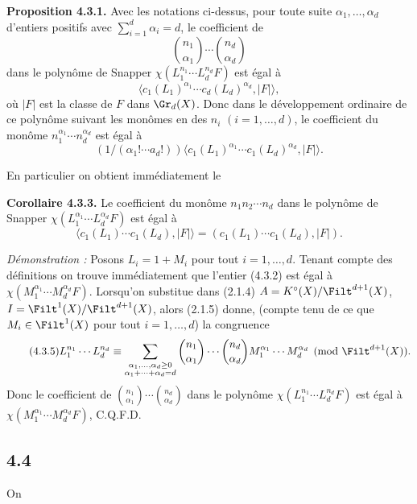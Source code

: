 \textbf{Proposition 4.3.1.} Avec les notations ci-dessus, pour toute suite \(\alpha_1,\ldots,\alpha_d\) d'entiers positifs avec \(\sum_{i=1}^{d}\alpha_i=d\), le coefficient de
\[
 \binom{n_1}{\alpha_1}\cdots\binom{n_d}{\alpha_d}
\]
dans le polynôme de Snapper \(\chi(L_1^{n_1}\cdots L_d^{n_d}F)\) est égal à
\begin{equation}\tag{4.3.2}
 \bigl\langle c_1(L_1)^{\alpha_1}\cdots c_d(L_d)^{\alpha_d},\lvert F\rvert\bigr\rangle,
\end{equation}
où \(\lvert F\rvert\) est la classe de \(F\) dans \(\Gr_d(X)\). Donc dans le développement ordinaire de ce polynôme suivant les monômes en des \(n_i\) \((i=1,\ldots,d)\), le coefficient du monôme \(n_1^{\alpha_1}\cdots n_d^{\alpha_d}\) est égal à
\[
 (1/(\alpha_1! \cdots a_d!))
 \bigl\langle c_1(L_1)^{\alpha_1}\cdots c_1(L_d)^{\alpha_d},\lvert F\rvert\bigr\rangle.
\]

En particulier on obtient immédiatement le

\textbf{Corollaire 4.3.3.} Le coefficient du monôme \(n_1n_2\cdots n_d\) dans le polynôme de Snapper \(\chi(L_1^{\alpha_1}\cdots L_d^{\alpha_d}F)\) est égal à
\begin{equation}\tag{4.3.4}
 \bigl\langle c_1(L_1)\cdots c_1(L_d),\lvert F\rvert\bigr\rangle
 =
 (c_1(L_1)\cdots c_1(L_d),\lvert F\rvert).
\end{equation}

\emph{Démonstration :} Posons \(L_i=1+M_i\) pour tout \(i=1,\ldots,d\). Tenant compte des définitions on trouve immédiatement que l'entier (4.3.2) est égal à \(\chi(M_1^{\alpha_1}\cdots M_d^{\alpha_d}F)\). Lorsqu'on substitue dans (2.1.4) \(A=K^\circ(X)/\Filt^{d+1}(X)\), \(I=\Filt^1(X)/\Filt^{d+1}(X)\), alors (2.1.5) donne, (compte tenu de ce que \(M_i\in\Filt^1(X)\) pour tout \(i=1,\ldots,d\)) la congruence
\begin{equation}\tag{4.3.5}
 L_1^{n_1}\cdots L_d^{n_d}
 \equiv
 \sum_{\substack{\alpha_1,\ldots,\alpha_d\geq0\\ \alpha_1+\cdots+\alpha_d=d}}
 \binom{n_1}{\alpha_1}\cdots\binom{n_d}{\alpha_d}
 M_1^{\alpha_1}\cdots M_d^{\alpha_d}
 \pmod{\Filt^{d+1}(X)}.
\end{equation}
Donc le coefficient de \(\binom{n_1}{\alpha_1}\cdots\binom{n_d}{\alpha_d}\) dans le polynôme \(\chi(L_1^{n_1}\cdots L_d^{n_d}F)\) est égal à \(\chi(M_1^{\alpha_1}\cdots M_d^{\alpha_d}F)\), C.Q.F.D.

\subsection*{4.4}
On
